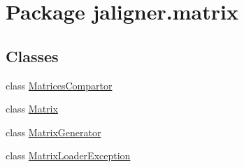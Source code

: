 \hypertarget{namespacejaligner_1_1matrix}{\section{Package jaligner.\+matrix}
\label{namespacejaligner_1_1matrix}
}
\subsection*{Classes}
\begin{DoxyCompactItemize}
\item 
class \hyperlink{classjaligner_1_1matrix_1_1_matrices_compartor}{Matrices\+Compartor}
\item 
class \hyperlink{classjaligner_1_1matrix_1_1_matrix}{Matrix}
\item 
class \hyperlink{classjaligner_1_1matrix_1_1_matrix_generator}{Matrix\+Generator}
\item 
class \hyperlink{classjaligner_1_1matrix_1_1_matrix_loader_exception}{Matrix\+Loader\+Exception}
\end{DoxyCompactItemize}
